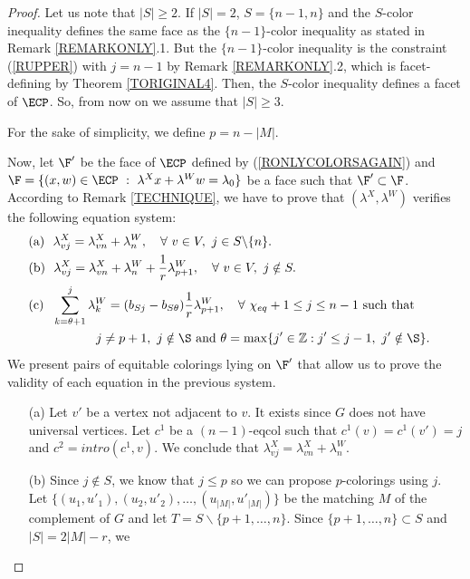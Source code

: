 \begin{proof}
Let us note that $|S| \geq 2$. If $|S| = 2$, $S = \{n-1,n\}$ and the $S$-color inequality defines the same
face as the $\{n-1\}$-color inequality as stated in Remark \ref{REMARKONLY}.1. But the $\{n-1\}$-color inequality
is the constraint (\ref{RUPPER}) with $j = n-1$ by Remark \ref{REMARKONLY}.2, which is facet-defining by Theorem \ref{TORIGINAL4}. Then, the $S$-color inequality defines a facet of $\ECP$. So, from now on we assume that
$|S| \geq 3$.

For the sake of simplicity, we define $p = n - |M|$.

Now, let $\F'$ be the face of $\ECP$ defined by (\ref{RONLYCOLORSAGAIN}) and
$\F = \{ (x,w) \in \ECP ~:~ \lambda^X x + \lambda^W w = \lambda_0\}$ be a face such that $\F' \subset \F$.
According to Remark \ref{TECHNIQUE}, we have to prove that $(\lambda^X, \lambda^W)$ verifies the following equation system: 
\begin{align*}
&\textrm{(a)}~~ \lambda^X_{vj} = \lambda^X_{vn} + \lambda^W_n,~~~\forall~v \in V,~
                   j \in S \backslash \{n\}. & \\
&\textrm{(b)}~~ \lambda^X_{vj} = \lambda^X_{vn} + \lambda^W_n + \frac{1}{r} \lambda^W_{p+1},~~~\forall~v \in V,~
                   j \notin S. & \\
&\textrm{(c)}~~ \sum_{k = \theta+1}^j \lambda^W_k = (b_{Sj} - b_{S\theta}) \frac{1}{r} \lambda^W_{p+1}, ~~~\forall~\chi_{eq}+1 \leq j \leq n - 1 ~\textrm{such that} &  \\
&~~~~~~~~~~~~~~~~ j \neq p+1,~ j \notin \S ~\textrm{and}~ \theta = \max \{j' \in \mathbb{Z} : j' \leq j-1,~j' \notin \S\}. &
\end{align*}
We present pairs of equitable colorings lying on $\F'$ that allow us to
prove the validity of each equation in the previous system.
\begin{enumerate}
\item[(a)] Let $v'$ be a vertex not adjacent to $v$. It exists since $G$ does not have universal vertices.
Let $c^1$ be a $(n-1)$-eqcol such that $c^1(v) = c^1(v') = j$ and $c^2 = intro(c^1,v)$. We conclude that
$\lambda^X_{v j} = \lambda^X_{v n} + \lambda^W_n$.
\item[(b)] Since $j \notin S$, we know that $j \leq p$ so we can propose $p$-colorings using $j$. Let $\{ (u_1, u'_1), (u_2, u'_2), \ldots, (u_{|M|}, u'_{|M|}) \}$ be the matching $M$ of the complement of $G$ and
let $T = S \backslash \{ p + 1, \ldots, n \}$. Since $\{ p + 1, \ldots, n \} \subset S$ and $|S| = 2|M| - r$, we

\end{enumerate}
\end{proof}
